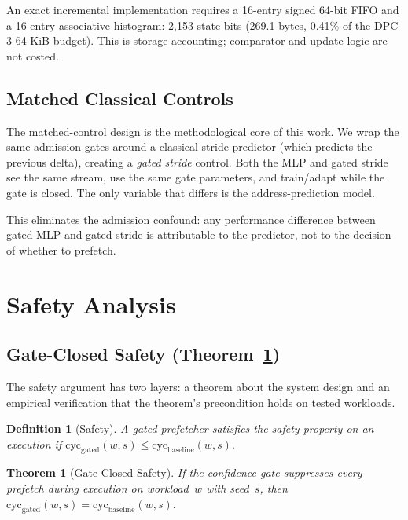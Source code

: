 \documentclass[conference]{IEEEtran}
\newtheorem{definition}{Definition}
\newtheorem{theorem}{Theorem}
\begin{document}
An exact incremental implementation requires a 16-entry signed 64-bit FIFO
and a 16-entry associative histogram: 2,153 state bits (269.1 bytes, 0.41\%
of the DPC-3 64-KiB budget). This is storage accounting; comparator and
update logic are not costed.

\subsection{Matched Classical Controls}
\label{sec:matched}

The matched-control design is the methodological core of this work. We wrap
the same admission gates around a classical stride predictor
(which predicts the previous delta), creating a \emph{gated stride} control.
Both the MLP and gated stride see the same stream, use the same gate
parameters, and train/adapt while the gate is closed. The only variable that
differs is the address-prediction model.

This eliminates the admission confound: any performance difference between
gated MLP and gated stride is attributable to the predictor, not to the
decision of whether to prefetch.

\section{Safety Analysis}
\label{sec:safety}

\subsection{\texorpdfstring{Gate-Closed Safety (Theorem~\ref{thm:safety})}{Gate-Closed Safety (Theorem 1)}}

The safety argument has two layers: a theorem about the system design and an
empirical verification that the theorem's precondition holds on tested
workloads.

\begin{definition}[Safety]
\label{def:safety}
A gated prefetcher satisfies the safety property on an execution if
$\text{cyc}_{\text{gated}}(w, s) \leq \text{cyc}_{\text{baseline}}(w, s).$
\end{definition}

\begin{theorem}[Gate-Closed Safety]
\label{thm:safety}
If the confidence gate suppresses every prefetch during execution on
workload~$w$ with seed~$s$, then
$\text{cyc}_{\text{gated}}(w, s) = \text{cyc}_{\text{baseline}}(w, s).$
\end{theorem}
\end{document}
